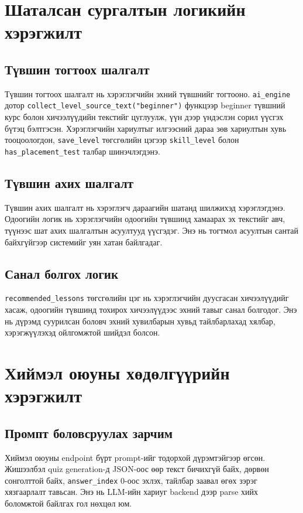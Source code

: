 \section{Шаталсан сургалтын логикийн хэрэгжилт}
\subsection{Түвшин тогтоох шалгалт}
Түвшин тогтоох шалгалт нь хэрэглэгчийн эхний түвшнийг тогтооно. \texttt{ai\_engine} дотор \texttt{collect\_level\_source\_text("beginner")} функцээр beginner түвшний курс болон хичээлүүдийн текстийг цуглуулж, үүн дээр үндэслэн сорил үүсгэх бүтэц бэлтгэсэн. Хэрэглэгчийн хариултыг илгээсний дараа зөв хариултын хувь тооцоологдон, \texttt{save\_level} төгсгөлийн цэгээр \texttt{skill\_level} болон \texttt{has\_placement\_test} талбар шинэчлэгдэнэ.

\subsection{Түвшин ахих шалгалт}
Түвшин ахих шалгалт нь хэрэглэгч дараагийн шатанд шилжихэд хэрэглэгдэнэ. Одоогийн логик нь хэрэглэгчийн одоогийн түвшинд хамаарах эх текстийг авч, түүнээс шат ахих шалгалтын асуултууд үүсгэдэг. Энэ нь тогтмол асуултын сантай байхгүйгээр системийг уян хатан байлгадаг.

\subsection{Санал болгох логик}
\texttt{recommended\_lessons} төгсгөлийн цэг нь хэрэглэгчийн дуусгасан хичээлүүдийг хасаж, одоогийн түвшинд тохирох хичээлүүдээс эхний тавыг санал болгодог. Энэ нь дүрэмд суурилсан боловч эхний хувилбарын хувьд тайлбарлахад хялбар, хэрэгжүүлэхэд ойлгомжтой шийдэл болсон.

\section{Хиймэл оюуны хөдөлгүүрийн хэрэгжилт}

\subsection{Промпт боловсруулах зарчим}
Хиймэл оюуны endpoint бүрт prompt-ийг тодорхой дүрэмтэйгээр өгсөн. Жишээлбэл quiz generation-д JSON-оос өөр текст бичихгүй байх, дөрвөн сонголттой байх, \texttt{answer\_index} 0-оос эхлэх, тайлбар заавал өгөх зэрэг хязгаарлалт тавьсан. Энэ нь LLM-ийн хариуг backend дээр parse хийх боломжтой байлгах гол нөхцөл юм.

